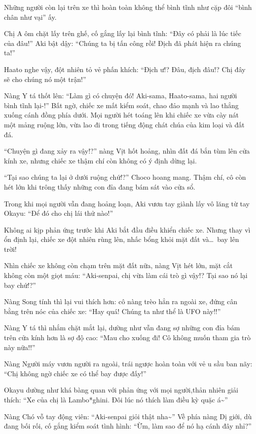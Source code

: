 \documentclass[../main.tex]{subfiles}
\begin{document}
Những người còn lại trên xe thì hoàn toàn không thể bình tĩnh như cặp đôi ``bình chân như vại'' ấy.

Chị A ôm chặt lấy trên ghế, cố gắng lấy lại bình tĩnh: ``Đây có phải là lúc tiếc của đâu!'' Aki bật dậy: ``Chúng ta bị tấn công rồi! Địch đã phát hiện ra chúng ta!''

Haato nghe vậy, đột nhiên tỏ vẻ phấn khích: ``Địch ư!? Đâu, địch đâu!? Chị đây sẽ cho chúng nó một trận!''

Nàng Y tá thốt lên: ``Làm gì có chuyện đó! Aki-sama, Haato-sama, hai người bình tĩnh lại-!'' Bất ngờ, chiếc xe mất kiểm soát, chao đảo mạnh và lao thẳng xuống cánh đồng phía dưới. Mọi người hét toáng lên khi chiếc xe vừa cày nát một mảng ruộng lớn, vừa lao đi trong tiếng động chát chúa của kim loại và đất đá.

``Chuyện gì đang xảy ra vậy!?'' nàng Vịt hốt hoảng, nhìn đất đá bắn tùm lên cửa kính xe, nhưng chiếc xe thậm chí còn không có ý định dừng lại.

``Tại sao chúng ta lại ở dưới ruộng chứ!?'' Choco hoang mang. Thậm chí, cô còn hét lớn khi trông thấy những con đỉa đang bám sát vào cửa sổ.

Trong khi mọi người vẫn đang hoảng loạn, Aki vươn tay giành lấy vô lăng từ tay Okayu: ``Để đó cho chị lái thử nào!''

Không ai kịp phản ứng trước khi Aki bắt đầu điều khiển chiếc xe. Nhưng thay vì ổn định lại, chiếc xe đột nhiên rùng lên, nhấc bổng khỏi mặt đất và\dots\ bay lên trời!

Nhìn chiếc xe không còn chạm trên mặt đất nữa, nàng Vịt hét lớn, mặt cắt không còn một giọt máu: ``Aki-senpai, chị vừa làm cái trò gì vậy!? Tại sao nó lại bay chứ!?''

Nàng Song tính thì lại vui thích hơn: cô nàng trèo hẳn ra ngoài xe, đứng cân bằng trên nóc của chiếc xe: ``Hay quá! Chúng ta như thể là UFO này!!''

Nàng Y tá thì nhắm chặt mắt lại, dường như vẫn đang sợ những con đỉa bám trên cửa kính hơn là sợ độ cao: ``Mau cho xuống đi! Cô không muốn tham gia trò này nữa!!''

Nàng Người máy vươn người ra ngoài, trái ngược hoàn toàn với vẻ u sầu ban nãy: ``Chị không ngờ chiếc xe có thể bay được đấy!''

Okayu dường như khá bàng quan với phản ứng với mọi người,thản nhiên giải thích: ``Xe của chị là Lambo*ghini. Đôi lúc nó thích làm điều kỳ quặc á\~{}''

Nàng Chó vỗ tay động viên: ``Aki-senpai giỏi thật nha\~{}'' Về phía nàng Dị giới, dù đang bối rối, cố gắng kiểm soát tình hình: ``Ừm, làm sao để nó hạ cánh đây nhỉ?''
\end{document}
